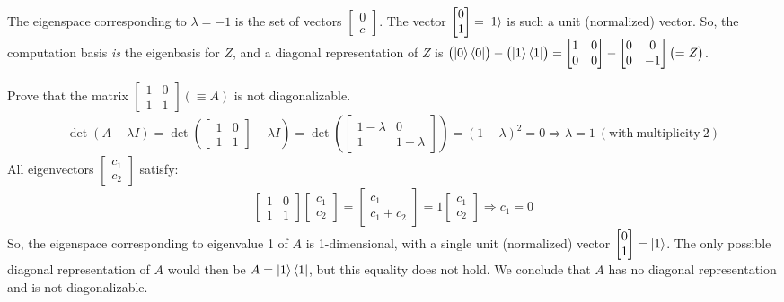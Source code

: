 The eigenspace corresponding to $\lambda = -1$ is the set of vectors $\begin{bmatrix}0 \\ c\end{bmatrix}$.  The vector $\begin{bmatrix} 0 \\ 1\end{bmatrix}=\ket{1}$ is such a unit (normalized) vector.  So, the computation basis \textit{is} the eigenbasis for $Z$, and a diagonal representation of $Z$ is $\bigl(\ket{0}\bra{0}\bigr) - \bigl(\ket{1}\bra{1}\bigr) = \begin{bmatrix}1 & 0 \\ 0 & 0\end{bmatrix} - \begin{bmatrix}0 & 0 \\ 0 & -1\end{bmatrix} \bigl( = Z\bigr)$.


 Prove that the matrix $\begin{bmatrix}1 & 0 \\ 1 & 1\end{bmatrix} (\equiv A)$ is not diagonalizable.
\Soln
\begin{align*}\det(A-\lambda I) = 
	\det \left(\begin{bmatrix}
	1 & 0 \\
	1 & 1
	\end{bmatrix} - \lambda I \right) = \det \left(\begin{bmatrix}1-\lambda & 0 \\ 1 & 1-\lambda\end{bmatrix}\right)= (1 - \lambda)^2 = 0 \Rightarrow \lambda = 1\ \mathrm{(with\ multiplicity\ 2)}
\end{align*}
All eigenvectors $\begin{bmatrix}c_1\\c_2\end{bmatrix}$ satisfy:
\begin{align*}
	\begin{bmatrix}
		1 & 0 \\
		1 & 1
	\end{bmatrix}
	\begin{bmatrix}
		c_1 \\
		c_2
	\end{bmatrix} =
	\begin{bmatrix}
	      c_1 \\
	      c_1+c_2
	\end{bmatrix} =
	 1
	\begin{bmatrix}
		c_1 \\
		c_2
	\end{bmatrix}
	\Rightarrow c_1 = 0
\end{align*}
So, the eigenspace corresponding to eigenvalue 1 of $A$ is 1-dimensional, with a single unit (normalized) vector $\begin{bmatrix}0 \\ 1\end{bmatrix}=\ket{1}$. The only possible diagonal representation of $A$ would then be $A = \ket{1}\bra{1}$, but this equality does not hold.  We conclude that $A$ has no diagonal representation and is not diagonalizable.

